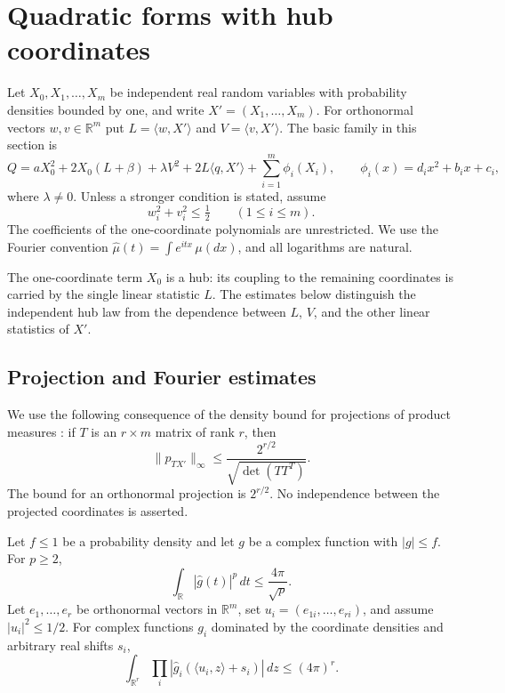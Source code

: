 \section{Quadratic forms with hub coordinates}\label{sec:hubs}

Let $X_0,X_1,\ldots,X_m$ be independent real random variables with
probability densities bounded by one, and write $X'=(X_1,\ldots,X_m)$.
For orthonormal vectors $w,v\in\mathbb R^m$ put
$L=\langle w,X'\rangle$ and $V=\langle v,X'\rangle$.
The basic family in this section is
\begin{equation}\label{eq:hub-normal}
 Q=aX_0^2+2X_0(L+\beta)+\lambda V^2
       +2L\langle q,X'\rangle+\sum_{i=1}^m\phi_i(X_i),
 \qquad \phi_i(x)=d_ix^2+b_ix+c_i,
\end{equation}
where $\lambda\ne0$.  Unless a stronger condition is stated, assume
\begin{equation}\label{eq:hub-frame}
 w_i^2+v_i^2\le\tfrac12\qquad(1\le i\le m).
\end{equation}
The coefficients of the one-coordinate polynomials are unrestricted.
We use the Fourier convention
$\widehat\mu(t)=\int e^{itx}\,\mu(dx)$, and all logarithms are natural.

The one-coordinate term $X_0$ is a hub: its coupling to the remaining
coordinates is carried by the single linear statistic $L$.  The estimates
below distinguish the independent hub law from the dependence between
$L$, $V$, and the other linear statistics of $X'$.

\subsection{Projection and Fourier estimates}

We use the following consequence of the density bound for projections of
product measures \citep{LPP2016,RV2015}: if $T$ is an $r\times m$
matrix of rank $r$, then
\begin{equation}\label{eq:hub-projection}
 \|p_{TX'}\|_\infty\le
       \frac{2^{r/2}}{\sqrt{\det(TT^T)}}.
\end{equation}
The bound for an orthonormal projection is $2^{r/2}$.  No independence
between the projected coordinates is asserted.

\begin{lemma}\label{lem:hub-frame-integral}
Let $f\le1$ be a probability density and let $g$ be a complex function
with $|g|\le f$.  For $p\ge2$,
\begin{equation}\label{eq:hub-scalar-lp}
 \int_{\mathbb R}|\widehat g(t)|^p\,dt\le\frac{4\pi}{\sqrt p}.
\end{equation}
Let $e_1,\ldots,e_r$ be orthonormal vectors in $\mathbb R^m$, set
$u_i=(e_{1i},\ldots,e_{ri})$, and assume $|u_i|^2\le1/2$.
For complex functions $g_i$ dominated by the coordinate densities and
arbitrary real shifts $s_i$,
\begin{equation}\label{eq:hub-frame-int}
 \int_{\mathbb R^r}\prod_i
   |\widehat g_i(\langle u_i,z\rangle+s_i)|\,dz\le(4\pi)^r.
\end{equation}
\end{lemma}


